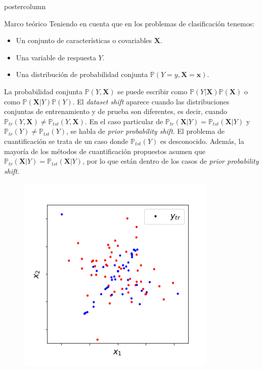 \documentclass{beamer}
\begin{document}
\begin{frame}
\begin{columns}
\begin{column}{.43\textwidth}
\begin{beamercolorbox}[center]{postercolumn}
\begin{minipage}{.98\textwidth}
{					\begin{myblock}{Marco teórico}
						Teniendo en cuenta que en los problemas de clasificación tenemos:
						\begin{itemize}
							\item Un conjunto de características o covariables $\boldsymbol{X}$.
							\item Una variable de respuesta $Y$.
							\item Una distribución de probabilidad conjunta
							$\mathbb{P}(Y=y,\boldsymbol{X=x})$.
						\end{itemize}
						La probabilidad conjunta $\mathbb{P}(Y,\boldsymbol{X})$ se puede escribir
						como $\mathbb{P}(Y|\boldsymbol{X})\mathbb{P}(\boldsymbol{X})$ o como
						$\mathbb{P}(\boldsymbol{X}|Y)\mathbb{P}(Y)$.
						El {\it dataset shift\/} aparece cuando las distribuciones conjuntas de
						entrenamiento y de prueba son diferentes, es decir, cuando
						$\mathbb{P}_{tr}(Y,\boldsymbol{X}) \neq
						\mathbb{P}_{tst}(Y,\boldsymbol{X})$. En el caso particular de $\mathbb{P}_{tr}(\boldsymbol{X}|Y) = \mathbb{P}_{tst}(\boldsymbol{X}|Y)$ y
						$\mathbb{P}_{tr}(Y) \neq \mathbb{P}_{tst}(Y)$, se habla de {\it prior probability shift}.
						El problema de cuantificación se trata de un caso donde
						$\mathbb{P}_{tst}(Y)$ es desconocido. Además, la mayoría de los métodos de
						cuantificación propuestos asumen que $\mathbb{P}_{tr}(\boldsymbol{X}|Y) =
						\mathbb{P}_{tst}(\boldsymbol{X}|Y)$, por lo que están dentro de los casos de
						{\it prior probability shift}.
						\begin{figure}
							\begin{minipage}{0.45\textwidth}
								\centering\includegraphics[width=0.85\textwidth]{../plots_teoria/cambios_train_scatterplot.png}

\end{minipage}
\end{figure}
\end{myblock}}
\end{minipage}
\end{beamercolorbox}
\end{column}
\end{columns}
\end{frame}
\end{document}
